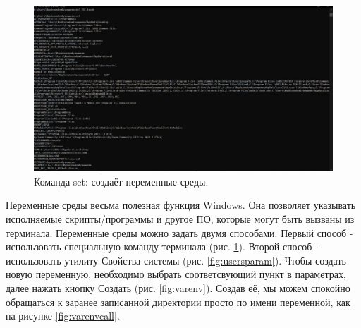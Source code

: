 \begin{figure}[h!]
    \centering
    \includegraphics[width=0.5\linewidth]{Pic/lab1/photo_2025-05-21_08-15-43.jpg}
    \caption{Команда set: создаёт переменные среды.}
    \label{fig:set}
\end{figure}

Переменные среды весьма полезная функция Windows. Она позволяет указывать исполняемые скрипты/программы и другое ПО, которые могут быть вызваны из терминала. Переменные среды можно задать двумя способами. Первый способ - использовать специальную команду терминала (рис. \ref{fig:set}). Второй способ - использовать утилиту Свойства системы (рис. \ref{fig:usersparam}). Чтобы создать новую переменную, необходимо выбрать соответсвующий пункт в параметрах, далее нажать кнопку Создать (рис. \ref{fig:varenv}). Создав её, мы можем спокойно обращаться к заранее записанной директории просто по имени переменной, как на рисунке \ref{fig:varenvcall}.

